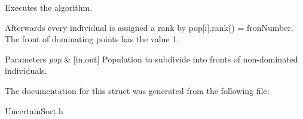 Executes the algorithm. 

Afterwards every individual is assigned a rank by pop\mbox{[}i\mbox{]}.rank() = fron\+Number. The front of dominating points has the value 1.


\begin{DoxyParams}{Parameters}
{\em pop} & \mbox{[}in,out\mbox{]} Population to subdivide into fronts of non-\/dominated individuals. \\
\hline
\end{DoxyParams}


The documentation for this struct was generated from the following file\+:\begin{DoxyCompactItemize}
\item 
Uncertain\+Sort.\+h\end{DoxyCompactItemize}

